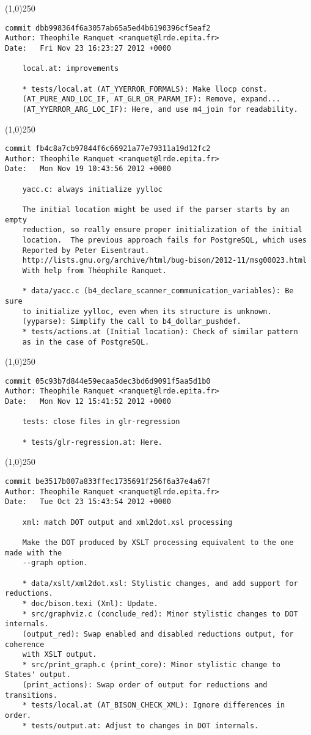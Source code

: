 \line(1,0){250}
\begin{verbatim}
commit dbb998364f6a3057ab65a5ed4b6190396cf5eaf2
Author: Theophile Ranquet <ranquet@lrde.epita.fr>
Date:   Fri Nov 23 16:23:27 2012 +0000

    local.at: improvements
    
    * tests/local.at (AT_YYERROR_FORMALS): Make llocp const.
    (AT_PURE_AND_LOC_IF, AT_GLR_OR_PARAM_IF): Remove, expand...
    (AT_YYERROR_ARG_LOC_IF): Here, and use m4_join for readability.

\end{verbatim}
\line(1,0){250}
\begin{verbatim}
commit fb4c8a7cb97844f6c66921a77e79311a19d12fc2
Author: Theophile Ranquet <ranquet@lrde.epita.fr>
Date:   Mon Nov 19 10:43:56 2012 +0000

    yacc.c: always initialize yylloc
    
    The initial location might be used if the parser starts by an empty
    reduction, so really ensure proper initialization of the initial
    location.  The previous approach fails for PostgreSQL, which uses
    Reported by Peter Eisentraut.
    http://lists.gnu.org/archive/html/bug-bison/2012-11/msg00023.html
    With help from Théophile Ranquet.
    
    * data/yacc.c (b4_declare_scanner_communication_variables): Be sure
    to initialize yylloc, even when its structure is unknown.
    (yyparse): Simplify the call to b4_dollar_pushdef.
    * tests/actions.at (Initial location): Check of similar pattern
    as in the case of PostgreSQL.

\end{verbatim}
\line(1,0){250}
\begin{verbatim}
commit 05c93b7d844e59ecaa5dec3bd6d9091f5aa5d1b0
Author: Theophile Ranquet <ranquet@lrde.epita.fr>
Date:   Mon Nov 12 15:41:52 2012 +0000

    tests: close files in glr-regression
    
    * tests/glr-regression.at: Here.

\end{verbatim}
\line(1,0){250}
\begin{verbatim}
commit be3517b007a833ffec1735691f256f6a37e4a67f
Author: Theophile Ranquet <ranquet@lrde.epita.fr>
Date:   Tue Oct 23 15:43:54 2012 +0000

    xml: match DOT output and xml2dot.xsl processing
    
    Make the DOT produced by XSLT processing equivalent to the one made with the
    --graph option.
    
    * data/xslt/xml2dot.xsl: Stylistic changes, and add support for reductions.
    * doc/bison.texi (Xml): Update.
    * src/graphviz.c (conclude_red): Minor stylistic changes to DOT internals.
    (output_red): Swap enabled and disabled reductions output, for coherence
    with XSLT output.
    * src/print_graph.c (print_core): Minor stylistic change to States' output.
    (print_actions): Swap order of output for reductions and transitions.
    * tests/local.at (AT_BISON_CHECK_XML): Ignore differences in order.
    * tests/output.at: Adjust to changes in DOT internals.

\end{verbatim}
